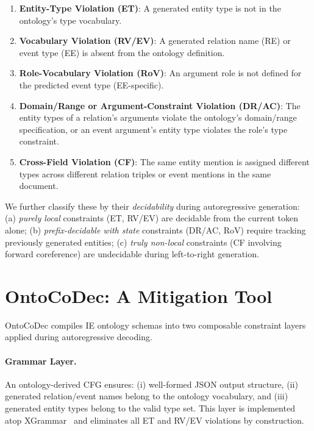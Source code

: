 \documentclass[11pt]{article}
\newcommand{\sys}{OntoCoDec}
\begin{document}
\begin{enumerate}[leftmargin=*,itemsep=2pt]
\item \textbf{Entity-Type Violation (ET)}: A generated entity type is not in the ontology's type vocabulary.
\item \textbf{Vocabulary Violation (RV/EV)}: A generated relation name (RE) or event type (EE) is absent from the ontology definition.
\item \textbf{Role-Vocabulary Violation (RoV)}: An argument role is not defined for the predicted event type (EE-specific).
\item \textbf{Domain/Range or Argument-Constraint Violation (DR/AC)}: The entity types of a relation's arguments violate the ontology's domain/range specification, or an event argument's entity type violates the role's type constraint.
\item \textbf{Cross-Field Violation (CF)}: The same entity mention is assigned different types across different relation triples or event mentions in the same document.
\end{enumerate}

We further classify these by their \emph{decidability} during autoregressive generation:
(a) \emph{purely local} constraints (ET, RV/EV) are decidable from the current token alone;
(b) \emph{prefix-decidable with state} constraints (DR/AC, RoV) require tracking previously generated entities;
(c) \emph{truly non-local} constraints (CF involving forward coreference) are undecidable during left-to-right generation.

\section{\sys{}: A Mitigation Tool}
\label{sec:method}

\sys{} compiles IE ontology schemas into two composable constraint layers applied during autoregressive decoding.

\paragraph{Grammar Layer.}
An ontology-derived CFG ensures: (i) well-formed JSON output structure, (ii) generated relation/event names belong to the ontology vocabulary, and (iii) generated entity types belong to the valid type set.
This layer is implemented atop XGrammar~\citep{zheng2024xgrammar} and eliminates all ET and RV/EV violations by construction.
\end{document}
